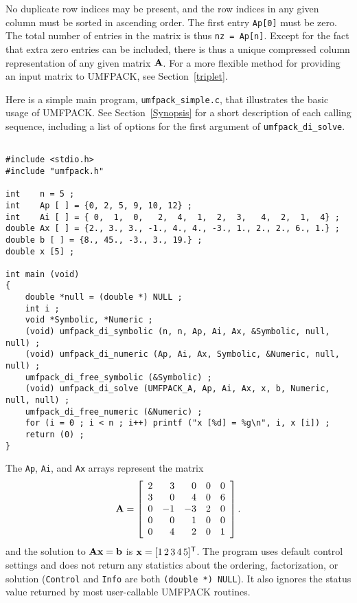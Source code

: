 \documentclass[11pt]{article}
\newcommand{\m}[1]{{\bf{#1}}}       %
\newcommand{\tr}{^{\sf T}}          %
\begin{document}
No duplicate row indices may be present, and the row indices in any given
column must be sorted in ascending order.  The first entry {\tt Ap[0]} must be
zero.  The total number of entries in the matrix is thus {\tt nz = Ap[n]}.
Except for the fact that extra zero entries can be included, there is thus a
unique compressed column representation of any given matrix $\m{A}$.
For a more flexible method for providing an input matrix to UMFPACK,
see Section~\ref{triplet}.

Here is a simple main program, {\tt umfpack\_simple.c}, that illustrates the
basic usage of UMFPACK.  See Section~\ref{Synopsis} for a short description
of each calling sequence, including a list of options for the first
argument of {\tt umfpack\_di\_solve}.

{\footnotesize
\begin{verbatim}

#include <stdio.h>
#include "umfpack.h"

int    n = 5 ;
int    Ap [ ] = {0, 2, 5, 9, 10, 12} ;
int    Ai [ ] = { 0,  1,  0,   2,  4,  1,  2,  3,   4,  2,  1,  4} ;
double Ax [ ] = {2., 3., 3., -1., 4., 4., -3., 1., 2., 2., 6., 1.} ;
double b [ ] = {8., 45., -3., 3., 19.} ;
double x [5] ;

int main (void)
{
    double *null = (double *) NULL ;
    int i ;
    void *Symbolic, *Numeric ;
    (void) umfpack_di_symbolic (n, n, Ap, Ai, Ax, &Symbolic, null, null) ;
    (void) umfpack_di_numeric (Ap, Ai, Ax, Symbolic, &Numeric, null, null) ;
    umfpack_di_free_symbolic (&Symbolic) ;
    (void) umfpack_di_solve (UMFPACK_A, Ap, Ai, Ax, x, b, Numeric, null, null) ;
    umfpack_di_free_numeric (&Numeric) ;
    for (i = 0 ; i < n ; i++) printf ("x [%d] = %g\n", i, x [i]) ;
    return (0) ;
}

\end{verbatim}
}

The {\tt Ap}, {\tt Ai}, and {\tt Ax} arrays represent the matrix
\[
\m{A} = \left[
\begin{array}{rrrrr}
 2 &  3 &  0 &  0 &  0 \\
 3 &  0 &  4 &  0 &  6 \\
 0 & -1 & -3 &  2 &  0 \\
 0 &  0 &  1 &  0 &  0 \\
 0 &  4 &  2 &  0 &  1 \\
\end{array}
\right].
\]
and the solution to $\m{Ax}=\m{b}$ is $\m{x} = [1 \, 2 \, 3 \, 4 \, 5]\tr$.
The program uses default control settings and does not return any statistics
about the ordering, factorization, or solution ({\tt Control} and {\tt Info}
are both {\tt (double *) NULL}).  It also ignores the status value returned by
most user-callable UMFPACK routines.
\end{document}
